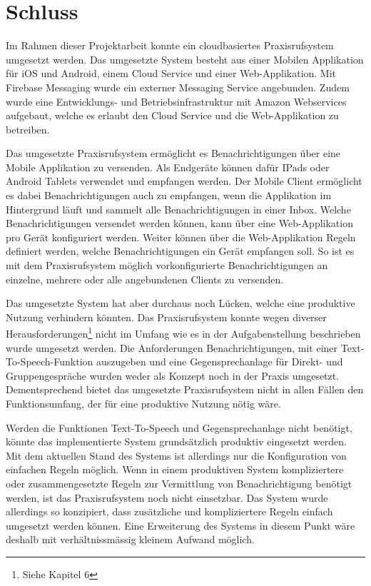 \section {Schluss}

Im Rahmen dieser Projektarbeit konnte ein cloudbasiertes Praxisrufsystem umgesetzt werden.
Das umgesetzte System besteht aus einer Mobilen Applikation für iOS und Android, einem Cloud Service und einer Web-Applikation.
Mit Firebase Messaging wurde ein externer Messaging Service angebunden.
Zudem wurde eine Entwicklungs- und Betriebsinfrastruktur mit Amazon Webservices aufgebaut, welche es erlaubt den Cloud Service und die Web-Applikation zu betreiben.

Das umgesetzte Praxisrufsystem ermöglicht es Benachrichtigungen über eine Mobile Applikation zu versenden.
Als Endgeräte können dafür IPads oder Android Tablets verwendet und empfangen werden.
Der Mobile Client ermöglicht es dabei Benachrichtigungen auch zu empfangen, wenn die Applikation im Hintergrund läuft und sammelt alle Benachrichtigungen in einer Inbox.
Welche Benachrichtigungen versendet werden können, kann über eine Web-Applikation pro Gerät konfiguriert werden.
Weiter können über die Web-Applikation Regeln definiert werden, welche Benachrichtigungen ein Gerät empfangen soll.
So ist es mit dem Praxisrufsystem möglich vorkonfigurierte Benachrichtigungen an einzelne, mehrere oder alle angebundenen Clients zu versenden.

Das umgesetzte System hat aber durchaus noch Lücken, welche eine produktive Nutzung verhindern könnten.
Das Praxisrufsystem konnte wegen diverser Herausforderungen\footnote{Siehe Kapitel 6} nicht im Umfang wie es in der Aufgabenstellung beschrieben wurde umgesetzt werden.
Die Anforderungen Benachrichtigungen, mit einer Text-To-Speech-Funktion auszugeben und eine Gegensprechanlage für Direkt- und Gruppengespräche wurden weder als Konzept noch in der Praxis umgesetzt.
Dementsprechend bietet das umgesetzte Praxisrufsystem nicht in allen Fällen den Funktionsumfang, der für eine produktive Nutzung nötig wäre.

Werden die Funktionen Text-To-Speech und Gegensprechanlage nicht benötigt, könnte das implementierte System grundsätzlich produktiv eingesetzt werden.
Mit dem aktuellen Stand des Systems ist allerdings nur die Konfiguration von einfachen Regeln möglich.
Wenn in einem produktiven System kompliziertere oder zusammengesetzte Regeln zur Vermittlung von Benachrichtigung benötigt werden, ist das Praxisrufsystem noch nicht einsetzbar.
Das System wurde allerdings so konzipiert, dass zusätzliche und kompliziertere Regeln einfach umgesetzt werden können.
Eine Erweiterung des Systems in diesem Punkt wäre deshalb mit verhältnissmässig kleinem Aufwand möglich.

